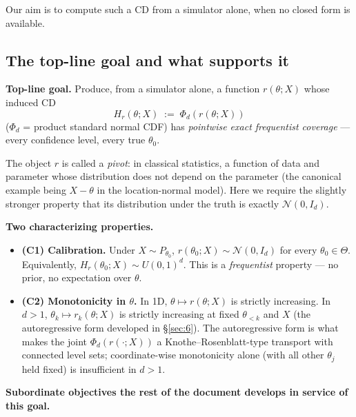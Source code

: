 \documentclass[11pt]{article}
\providecommand{\tightlist}{\setlength{\itemsep}{0pt}\setlength{\parskip}{0pt}}
\begin{document}
Our aim is to compute such a CD from a simulator alone, when no closed
form is available.

\subsection{The top-line goal and what supports it}\label{subsec:1.3}

\textbf{Top-line goal.} Produce, from a simulator alone, a function
\(r(\theta; X)\) whose induced CD \[
H_r(\theta; X) \;:=\; \Phi_d(r(\theta; X))
\] (\(\Phi_d\) = product standard normal CDF) has \emph{pointwise exact
frequentist coverage} --- every confidence level, every true
\(\theta_0\).

The object \(r\) is called a \emph{pivot}: in classical statistics, a
function of data and parameter whose distribution does not depend on the
parameter (the canonical example being \(X - \theta\) in the
location-normal model). Here we require the slightly stronger property
that its distribution under the truth is exactly
\(\mathcal{N}(0, I_d)\).

\textbf{Two characterizing properties.}

\begin{itemize}
\tightlist
\item
  \textbf{(C1) Calibration.} Under \(X \sim P_{\theta_0}\),
  \(r(\theta_0; X) \sim \mathcal{N}(0, I_d)\) for every
  \(\theta_0 \in \Theta\). Equivalently,
  \(H_r(\theta_0; X) \sim U(0,1)^d\). This is a \emph{frequentist}
  property --- no prior, no expectation over \(\theta\).
\item
  \textbf{(C2) Monotonicity in \(\theta\).} In 1D,
  \(\theta \mapsto r(\theta; X)\) is strictly increasing. In \(d > 1\),
  \(\theta_k \mapsto r_k(\theta; X)\) is strictly increasing at fixed
  \(\theta_{<k}\) and \(X\) (the autoregressive form developed in
  \S\ref{sec:6}). The autoregressive form is what makes the joint
  \(\Phi_d(r(\cdot; X))\) a Knothe--Rosenblatt-type transport with
  connected level sets; coordinate-wise monotonicity alone (with all
  other \(\theta_j\) held fixed) is insufficient in \(d > 1\).
\end{itemize}

\textbf{Subordinate objectives the rest of the document develops in
service of this goal.}
\end{document}
